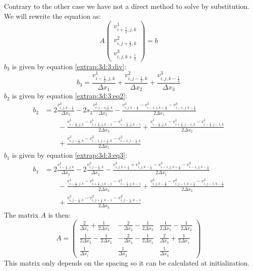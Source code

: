 Contrary to the other case we have not a direct method to solve by substitution. We will rewrite the equation as:
\begin{equation}
 A\begin{pmatrix}
   v^{1}_{i+\frac{1}{2},j,k}\\
   v^2_{i,j+\frac{1}{2},k}\\
   v^{3}_{i,j,k+\frac{1}{2}}
  \end{pmatrix}=b
\end{equation}
$b_3$ is given by equation \ref{extrap:3d:3:div}:
\begin{equation}
 b_3=\frac{v^{1}_{i-\frac{1}{2},j,k}}{\Delta x_1}+\frac{v^{2}_{i,j-\frac{1}{2},k}}{\Delta x_2}+\frac{v^{3}_{i,j,k-\frac{1}{2}}}{\Delta x_3}
\end{equation}
$b_2$ is given by equation \ref{extrap:3d:3:eq2}:
\begin{equation}
\begin{split}
 b_2&=2\frac{v^{3}_{i,j,k-\frac{1}{2}}}{\Delta x_3}-2s_2\frac{v^{2}_{i,j-s_2\frac{1}{2},k}}{\Delta x_2}
	-\frac{v^{3}_{i,j,k-\frac{1}{2}}-v^{3}_{i-1,j,k+\frac{1}{2}}-v^{3}_{i-1,j,k-\frac{1}{2}}}{2\Delta x_1}\\
	&\qquad -\frac{v^1_{i-\frac{1}{2},j,k}-v^{1}_{i+\frac{1}{2},j,k-1}-v^{1}_{i-\frac{1}{2},j,k-1}}{2\Delta x_3}
	+\frac{v^{1}_{i-\frac{1}{2},j,k}-v^{1}_{i+\frac{1}{2},j-1,k}-v^{1}_{i-\frac{1}{2},j-1,k}}{2\Delta x_2}\\
	&\qquad +\frac{v^2_{i,j-\frac{1}{2},k}-v^{2}_{i-1,j+\frac{1}{2},k}-v^{2}_{i-1,j-\frac{1}{2},k}}{2\Delta x_1}
\end{split}
\end{equation}
$b_1$ is given by equation \ref{extrap:3d:3:eq3}:
\begin{equation}
 \begin{split}
	b_1&=2\frac{v^{1}_{i-\frac{1}{2},j,k}}{\Delta x_1}-2\frac{v^{2}_{i,j-\frac{1}{2},k}}{\Delta x_2}
	-\frac{v^{3}_{i,j,k+\frac{1}{2}}+v^{3}_{i,j,k-\frac{1}{2}}-v^{3}_{i-1,j,k+\frac{1}{2}}-v^{3}_{i-1,j,k-\frac{1}{2}}}{2\Delta x_1}\\
	&\qquad -\frac{v^1_{i-\frac{1}{2},j,k}-v^{1}_{i+\frac{1}{2},j,k-1}-v^{1}_{i-\frac{1}{2},j,k-1}}{2\Delta x_3}
	+\frac{v^{3}_{i,j,k-\frac{1}{2}}-v^{3}_{i,j-1,k+\frac{1}{2}}-v^{3}_{i,j-1,k-\frac{1}{2}}}{2\Delta x_2}\\
	&\qquad +\frac{v^2_{i,j-\frac{1}{2},k}-v^{2}_{i,j+\frac{1}{2},k-1}-v^{2}_{i,j-\frac{1}{2},k-1}}{2\Delta x_3}
	\end{split}
\end{equation}
The matrix $A$ is then:
\begin{equation}
 A=\begin{pmatrix}
    \frac{2}{\Delta x_1}+\frac{1}{2\Delta x_3}&-\frac{2}{\Delta x_2}-\frac{1}{2\Delta x_3}&\frac{1}{2\Delta x_1}-\frac{1}{2\Delta x_2}\\
    \frac{1}{2\Delta x_3}-\frac{1}{2\Delta x_2}&-\frac{2}{\Delta x_2}-\frac{1}{2\Delta x_1}&\frac{2}{\Delta x_3}+\frac{1}{2\Delta x_1}\\
    \frac{1}{\Delta x_1}&\frac{1}{\Delta x_2}&\frac{1}{\Delta x_3}
   \end{pmatrix}
\end{equation}
This matrix only depends on the spacing so it can be calculated at initialization.

